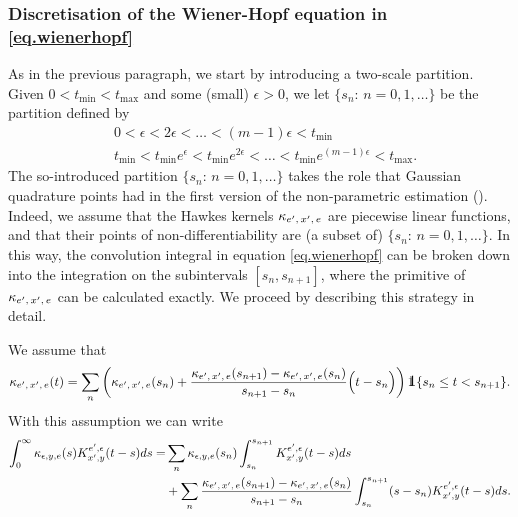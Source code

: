 \documentclass[10pt, article,table]{article}
\begin{document}
\subsubsection{Discretisation of the Wiener-Hopf equation in \eqref{eq.wienerhopf}}
As in the previous paragraph, we start by introducing a two-scale partition. Given $0<t_{\text{min}} < t_{\text{max}}$ and some (small) $\epsilon>0$,  we let $\lbrace s_n: \, n=0,1,\dots\rbrace$ be the partition defined by
\begin{equation*}
 \begin{split}
  &0< \epsilon < 2\epsilon < \dots <  (m-1)\epsilon < t_{\text{min}} \\
  &t_{\text{min}}< t_{\text{min}}e^{\epsilon} < t_{\text{min}}e^{2\epsilon} < \dots <  t_{\text{min}}e^{(m-1)\epsilon} < t_{\text{max}}.
 \end{split}
\end{equation*}
The so-introduced partition $\lbrace s_n: \, n=0,1,\dots\rbrace$ takes the role that Gaussian quadrature points had in the first  version of the non-parametric estimation (\citealp{BM16fir}). Indeed, we assume that the Hawkes kernels $\kappa_{e^{\prime},\, x^{\prime},\, e}$ are piecewise linear functions, and that their points of non-differentiability are (a subset of) $\lbrace s_n: \, n=0,1,\dots\rbrace$. In this way, the convolution integral in equation \eqref{eq.wienerhopf} can be broken down into the integration on the subintervals $[s_n, s_{n+1}]$, where the primitive of $\kappa_{e^{\prime},\, x^{\prime},\, e}$ can be calculated exactly. We proceed by describing this strategy in detail.


We assume that 
\begin{equation*}
 \hawkesKernel\subscriptexe (t)
 =
 \sum_{n} \left(
 \hawkesKernel\subscriptexe (s_n)
 +
 \frac{\hawkesKernel\subscriptexe (s_{n+1}) - \hawkesKernel\subscriptexe (s_n)}{s_{n+1}-s_n}\Big(t-s_n\Big)
 \right)\one\lbrace s_n \leq t < s_{n+1}\rbrace.
\end{equation*}
With this assumption we can write 
\begin{equation}\label{eq.piecewise_WHintegral}
 \begin{split}
 \int_{0}^{\infty} \kappa_{\epsilon, y, e} (s) K_{x^{\prime},y}^{e^{\prime},\epsilon}(t-s)ds
 =&
 \sum_{n} \kappa_{\epsilon, y, e} (s_n) \int_{s_n}^{s_{n+1}}K_{x^{\prime},y}^{e^{\prime},\epsilon}(t-s)ds
 \\
 &+
 \sum_{n} \frac{\kappa_{e^{\prime},\, x^{\prime},\, e} (s_{n+1}) - \kappa_{e^{\prime},\, x^{\prime},\, e} (s_n)}{s_{n+1}-s_n}
 \int_{s_n}^{s_{n+1}}(s-s_n)K_{x^{\prime},y}^{e^{\prime},\epsilon}(t-s)ds.
 \end{split}
\end{equation}
\end{document}
